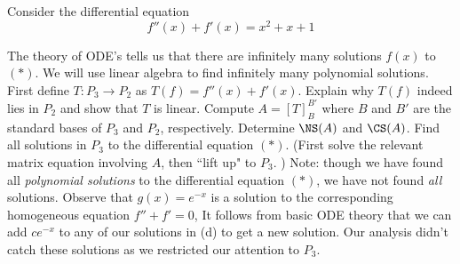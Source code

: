 \bb[itemsep=5pt]
\ii Consider the differential equation 
\[
f''(x)+f'(x)=x^2+x+1 \tag{$*$}
\]

The theory of ODE's tells us that there are infinitely many solutions $f(x)$ to $(*)$. We will use linear algebra to find infinitely many polynomial solutions. 
\bb
\ii First define $T\colon P_{3}\rightarrow P_{2}$ as $T(f)=f''(x)+f'(x)$. Explain why $T(f)$ indeed lies in $P_2$ and show that $T$ is linear. 
\ii Compute $A=[T]_{B}^{B'}$ where $B$ and  $B'$ are the standard bases of $P_{3}$ and $P_{2}$, respectively. 
\ii Determine $\NS(A)$ and $\CS(A)$. 
\ii Find all solutions in $P_3$ to the differential equation $(*)$. (First solve the relevant matrix equation involving $A$, then ``lift up" to $P_3$. )
\ee
{\footnotesize Note: though we have found all {\em polynomial solutions} to the differential equation $(*)$, we have not found {\em all} solutions. Observe that $g(x)=e^{-x}$ is a solution to the corresponding homogeneous equation $f''+f'=0$, It follows from basic ODE theory that we can add $ce^{-x}$ to any of our solutions in (d) to get a new solution. Our analysis didn't catch these solutions as we restricted our attention to $P_3$. }
\\
